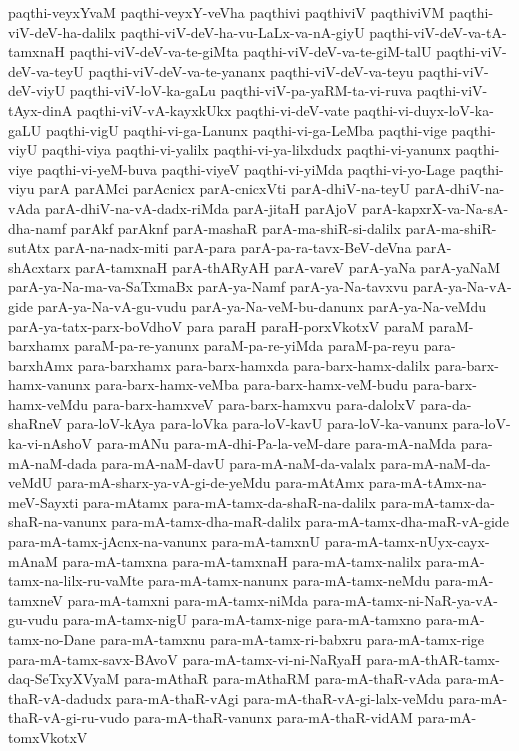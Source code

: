 {paqthi-veyxYvaM
paqthi-veyxY-veVha
paqthivi
paqthiviV
paqthiviVM
paqthi-viV-deV-ha-dalilx
paqthi-viV-deV-ha-vu-LaLx-va-nA-giyU
paqthi-viV-deV-va-tA-tamxnaH
paqthi-viV-deV-va-te-giMta
paqthi-viV-deV-va-te-giM-talU
paqthi-viV-deV-va-teyU
paqthi-viV-deV-va-te-yananx
paqthi-viV-deV-va-teyu
paqthi-viV-deV-viyU
paqthi-viV-loV-ka-gaLu
paqthi-viV-pa-yaRM-ta-vi-ruva
paqthi-viV-tAyx-dinA
paqthi-viV-vA-kayxkUkx
paqthi-vi-deV-vate
paqthi-vi-duyx-loV-ka-gaLU
paqthi-vigU
paqthi-vi-ga-Lanunx
paqthi-vi-ga-LeMba
paqthi-vige
paqthi-viyU
paqthi-viya
paqthi-vi-yalilx
paqthi-vi-ya-lilxdudx
paqthi-vi-yanunx
paqthi-viye
paqthi-vi-yeM-buva
paqthi-viyeV
paqthi-vi-yiMda
paqthi-vi-yo-Lage
paqthi-viyu
parA
parAMci
parAcnicx
parA-cnicxVti
parA-dhiV-na-teyU
parA-dhiV-na-vAda
parA-dhiV-na-vA-dadx-riMda
parA-jitaH
parAjoV
parA-kapxrX-va-Na-sA-dha-namf
parAkf
parAknf
parA-mashaR
parA-ma-shiR-si-dalilx
parA-ma-shiR-sutAtx
parA-na-nadx-miti
parA-para
parA-pa-ra-tavx-BeV-deVna
parA-shAcxtarx
parA-tamxnaH
parA-thARyAH
parA-vareV
parA-yaNa
parA-yaNaM
parA-ya-Na-ma-va-SaTxmaBx
parA-ya-Namf
parA-ya-Na-tavxvu
parA-ya-Na-vA-gide
parA-ya-Na-vA-gu-vudu
parA-ya-Na-veM-bu-danunx
parA-ya-Na-veMdu
parA-ya-tatx-parx-boVdhoV
para
paraH
paraH-porxVkotxV
paraM
paraM-barxhamx
paraM-pa-re-yanunx
paraM-pa-re-yiMda
paraM-pa-reyu
para-barxhAmx
para-barxhamx
para-barx-hamxda
para-barx-hamx-dalilx
para-barx-hamx-vanunx
para-barx-hamx-veMba
para-barx-hamx-veM-budu
para-barx-hamx-veMdu
para-barx-hamxveV
para-barx-hamxvu
para-dalolxV
para-da-shaRneV
para-loV-kAya
para-loVka
para-loV-kavU
para-loV-ka-vanunx
para-loV-ka-vi-nAshoV
para-mANu
para-mA-dhi-Pa-la-veM-dare
para-mA-naMda
para-mA-naM-dada
para-mA-naM-davU
para-mA-naM-da-valalx
para-mA-naM-da-veMdU
para-mA-sharx-ya-vA-gi-de-yeMdu
para-mAtAmx
para-mA-tAmx-na-meV-Sayxti
para-mAtamx
para-mA-tamx-da-shaR-na-dalilx
para-mA-tamx-da-shaR-na-vanunx
para-mA-tamx-dha-maR-dalilx
para-mA-tamx-dha-maR-vA-gide
para-mA-tamx-jAcnx-na-vanunx
para-mA-tamxnU
para-mA-tamx-nUyx-cayx-mAnaM
para-mA-tamxna
para-mA-tamxnaH
para-mA-tamx-nalilx
para-mA-tamx-na-lilx-ru-vaMte
para-mA-tamx-nanunx
para-mA-tamx-neMdu
para-mA-tamxneV
para-mA-tamxni
para-mA-tamx-niMda
para-mA-tamx-ni-NaR-ya-vA-gu-vudu
para-mA-tamx-nigU
para-mA-tamx-nige
para-mA-tamxno
para-mA-tamx-no-Dane
para-mA-tamxnu
para-mA-tamx-ri-babxru
para-mA-tamx-rige
para-mA-tamx-savx-BAvoV
para-mA-tamx-vi-ni-NaRyaH
para-mA-thAR-tamx-daq-SeTxyXVyaM
para-mAthaR
para-mAthaRM
para-mA-thaR-vAda
para-mA-thaR-vA-dadudx
para-mA-thaR-vAgi
para-mA-thaR-vA-gi-lalx-veMdu
para-mA-thaR-vA-gi-ru-vudo
para-mA-thaR-vanunx
para-mA-thaR-vidAM
para-mA-tomxVkotxV
}
